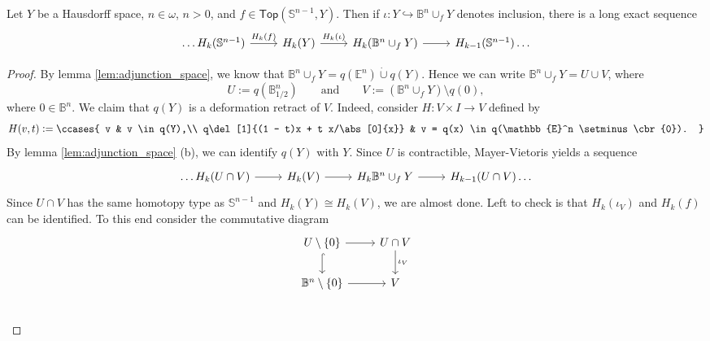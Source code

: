 \begin{proposition}
	Let $Y$ be a Hausdorff space, $n \in \omega$, $n > 0$, and $f \in \mathsf{Top}(\mathbb{S}^{n - 1},Y)$. Then if $\iota : Y \hookrightarrow  \mathbb{B}^n \cup_f Y$ denotes inclusion, there is a long exact sequence
	\begin{equation*}
		\begin{tikzcd}
			\dots H_k(\mathbb{S}^{n - 1}) \arrow[r,"H_k(f)"] & H_k(Y) \arrow[r,"H_k(\iota)"] & H_k(\mathbb{B}^n \cup_f Y) \arrow[r] & H_{k - 1}(\mathbb{S}^{n - 1}) \dots
		\end{tikzcd}
	\end{equation*}
\end{proposition}

\begin{proof}
	By lemma \ref{lem:adjunction_space}, we know that $\mathbb{B}^n \cup_f Y = q(\mathbb{E}^n) \dot{\cup} q(Y)$. Hence we can write $\mathbb{B}^n \cup_f Y = U \cup V$, where
	\begin{equation*}
		U := q(\mathbb{B}^n_{1/2}) \qquad \text{and} \qquad V := (\mathbb{B}^n \cup_f Y) \setminus q(0),
	\end{equation*}
	\noindent where $0 \in \mathbb{B}^n$. We claim that $q(Y)$ is a deformation retract of $V$. Indeed, consider $H : V \times I \to V$ defined by
	\begin{equation*}
		H(v,t) := \ccases{
			v & v \in q(Y),\\
			q\del[1]{(1 - t)x + t x/\abs[0]{x}} & v = q(x) \in q(\mathbb{E}^n \setminus \cbr{0}).
		}
	\end{equation*}
	By lemma \ref{lem:adjunction_space} (b), we can identify $q(Y)$ with $Y$. Since $U$ is contractible, Mayer-Vietoris yields a sequence
	\begin{equation*}
		\begin{tikzcd}
			\dots H_k (U \cap V) \arrow[r] & H_k(V) \arrow[r] & H_k{\mathbb{B}^n \cup_f Y} \arrow[r] & H_{k - 1}(U \cap V)\dots
		\end{tikzcd}
	\end{equation*}
	Since $U \cap V$ has the same homotopy type as $\mathbb{S}^{n - 1}$ and $H_k(Y) \cong H_k(V)$, we are almost done. Left to check is that $H_k(\iota_V)$ and $H_k(f)$ can be identified. To this end consider the commutative diagram
	\begin{equation*}
		\begin{tikzcd}
			U \setminus \cbr{0} \arrow[d,hook]\arrow[r] & U \cap V \arrow[d,"\iota_V"]\\
			\mathbb{B}^n \setminus \cbr{0} \arrow[r] & V\\

\end{tikzcd}
\end{equation*}
\end{proof}
